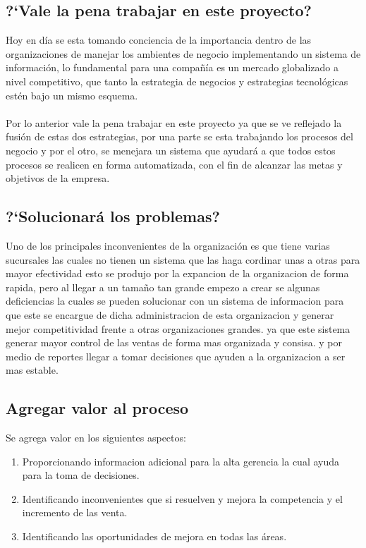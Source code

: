 \subsection{?`Vale la pena trabajar en este proyecto?}
Hoy en d\'ia se esta tomando conciencia de la importancia dentro de las organizaciones de manejar los ambientes de negocio implementando un sistema de informaci\'on, lo fundamental para una compa\~n\'ia es un mercado globalizado a nivel competitivo, que tanto la estrategia de negocios y estrategias tecnol\'ogicas est\'en bajo un mismo esquema.%
\\%
\\%
Por lo anterior vale la pena trabajar en este proyecto ya que se ve reflejado la fusi\'on de estas dos estrategias, por una parte se esta trabajando los procesos del negocio y por el otro, se menejara un sistema que ayudar\'a a que todos estos procesos se realicen en forma automatizada, con el fin de alcanzar las metas y objetivos de la empresa.%
%
\subsection{?`Solucionar\'a los problemas?}
Uno de los principales inconvenientes de la organizaci\'on es que tiene varias sucursales las cuales no tienen un sistema que las haga cordinar unas a otras para mayor efectividad esto se produjo por la expancion de la organizacion de forma rapida, pero al llegar a un tama\~no tan grande empezo a crear se algunas deficiencias la cuales se pueden solucionar con un sistema de informacion para que este se encargue de dicha administracion de esta organizacion y generar mejor competitividad frente a otras organizaciones grandes. ya que este sistema generar mayor control de las ventas de forma mas organizada y consisa. y por medio de reportes llegar a tomar decisiones que ayuden a la organizacion a ser mas estable.%
%
\subsection{Agregar valor al proceso}
Se agrega valor en los siguientes aspectos:%
\begin{enumerate}
	\item Proporcionando informacion adicional para la alta gerencia la cual ayuda para la toma de decisiones.
	\item Identificando inconvenientes que si resuelven y mejora la competencia y el incremento de las venta.
	\item Identificando las oportunidades de mejora en todas las \'areas.
\end{enumerate}%
%
